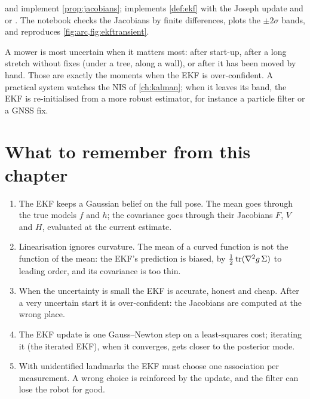 \begin{practice}
 and  implement
\cref{prop:jacobians};  implements \cref{def:ekf} with the
Joseph update and  or . The
notebook checks the Jacobians by finite differences, plots the
$\pm2\sigma$ bands, and reproduces \cref{fig:arc,fig:ekftransient}.
\end{practice}

\begin{mower}
A mower is most uncertain when it matters most: after start-up, after a
long stretch without fixes (under a tree, along a wall), or after it has
been moved by hand. Those are exactly the moments when the EKF is
over-confident. A practical system watches the NIS of
\cref{ch:kalman}; when it leaves its band, the EKF is re-initialised from a
more robust estimator, for instance a particle filter or a GNSS fix.
\end{mower}

\section*{What to remember from this chapter}

\begin{enumerate}[nosep]
  \item The EKF keeps a Gaussian belief on the full pose. The mean goes
    through the true models $f$ and $h$; the covariance goes through their
    Jacobians $F$, $V$ and $H$, evaluated at the current estimate.
  \item Linearisation ignores curvature. The mean of a curved function is
    not the function of the mean: the EKF's prediction is biased, by
    $\tfrac12\operatorname{tr}(\nabla^2g\,\Sigma)$ to leading order, and its covariance
    is too thin.
  \item When the uncertainty is small the EKF is accurate, honest and
    cheap. After a very uncertain start it is over-confident: the
    Jacobians are computed at the wrong place.
  \item The EKF update is one Gauss--Newton step on a least-squares cost;
    iterating it (the iterated EKF), when it converges, gets closer to the
    posterior mode.
  \item With unidentified landmarks the EKF must choose one association
    per measurement. A wrong choice is reinforced by the update, and the
    filter can lose the robot for good.
\end{enumerate}

